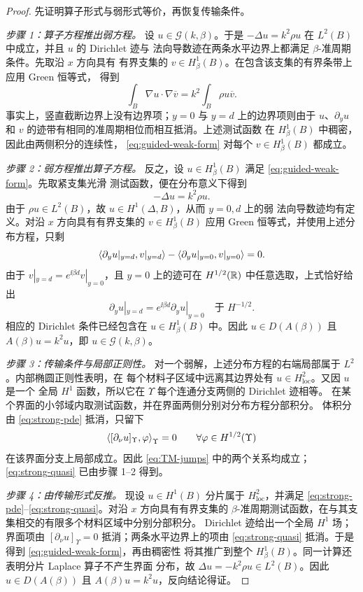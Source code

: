 \begin{proof}
先证明算子形式与弱形式等价，再恢复传输条件。

\emph{步骤 1：算子方程推出弱方程。}
设 $u\in\mathcal G(k,\beta)$。于是
$-\Delta u=k^2\rho u$ 在 $L^2(B)$ 中成立，并且 $u$ 的 Dirichlet 迹与
法向导数迹在两条水平边界上都满足 $\beta$-准周期条件。先取沿 $x$ 方向具有
有界支集的 $v\in H^1_\beta(B)$。在包含该支集的有界条带上应用 Green 恒等式，
得到
\[
  \int_B\nabla u\cdot\nabla\overline v
  =k^2\int_B\rho u\overline v.
\]
事实上，竖直截断边界上没有边界项；$y=0$ 与 $y=d$ 上的边界项则由于
$u$、$\partial_yu$ 和 $v$ 的迹带有相同的准周期相位而相互抵消。上述测试函数
在 $H^1_\beta(B)$ 中稠密，因此由两侧积分的连续性，
\eqref{eq:guided-weak-form} 对每个 $v\in H^1_\beta(B)$ 都成立。

\emph{步骤 2：弱方程推出算子方程。}
反之，设 $u\in H^1_\beta(B)$ 满足 \eqref{eq:guided-weak-form}。先取紧支集光滑
测试函数，便在分布意义下得到
\[
  -\Delta u=k^2\rho u.
\]
由于 $\rho u\in L^2(B)$，故 $u\in H^1(\Delta,B)$，从而 $y=0,d$ 上的弱
法向导数迹均有定义。对沿 $x$ 方向具有有界支集的
$v\in H^1_\beta(B)$ 应用 Green 恒等式，并使用上述分布方程，只剩
\[
  \left\langle \partial_yu|_{y=d},v|_{y=d}\right\rangle
  -\left\langle \partial_yu|_{y=0},v|_{y=0}\right\rangle=0.
\]
由于 $v|_{y=d}=e^{\ii\beta d}v|_{y=0}$，且 $y=0$ 上的迹可在
$H^{1/2}(\mathbb{R})$ 中任意选取，上式恰好给出
\[
  \partial_yu|_{y=d}
  =e^{\ii\beta d}\partial_yu|_{y=0}
  \quad\text{于 }H^{-1/2}.
\]
相应的 Dirichlet 条件已经包含在 $u\in H^1_\beta(B)$ 中。因此
$u\in D(A(\beta))$ 且 $A(\beta)u=k^2u$，即
$u\in\mathcal G(k,\beta)$。

\emph{步骤 3：传输条件与局部正则性。}
对一个弱解，上述分布方程的右端局部属于 $L^2$。内部椭圆正则性表明，在
每个材料子区域中远离其边界处有 $u\in H^2_{\mathrm{loc}}$。又因 $u$ 是一个
全局 $H^1$ 函数，所以它在 $\Upsilon$ 每个连通分支两侧的 Dirichlet 迹相等。
在某个界面的小邻域内取测试函数，并在界面两侧分别对分布方程分部积分。
体积分由 \eqref{eq:strong-pde} 抵消，只留下
\[
  \left\langle [\partial_\nu u]_{\Upsilon},\varphi\right\rangle_{\Upsilon}=0
  \qquad\forall\varphi\in H^{1/2}(\Upsilon)
\]
在该界面分支上局部成立。因此 \eqref{eq:TM-jumps} 中的两个关系均成立；
\eqref{eq:strong-quasi} 已由步骤 1--2 得到。

\emph{步骤 4：由传输形式反推。}
现设 $u\in H^1(B)$ 分片属于 $H^2_{\mathrm{loc}}$，并满足
\eqref{eq:strong-pde}--\eqref{eq:strong-quasi}。对沿 $x$ 方向具有有界支集的
$\beta$-准周期测试函数，在与其支集相交的有限多个材料区域中分别分部积分。
Dirichlet 迹给出一个全局 $H^1$ 场；界面项由
$[\partial_\nu u]_{\Upsilon}=0$ 抵消；两条水平边界上的项由
\eqref{eq:strong-quasi} 抵消。于是得到 \eqref{eq:guided-weak-form}，再由稠密性
将其推广到整个 $H^1_\beta(B)$。同一计算还表明分片 Laplace 算子不产生界面
分布，故
$\Delta u=-k^2\rho u\in L^2(B)$。因此 $u\in D(A(\beta))$ 且
$A(\beta)u=k^2u$，反向结论得证。
\end{proof}


